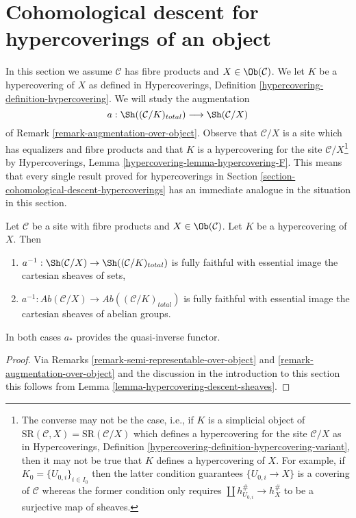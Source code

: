 \section{Cohomological descent for hypercoverings of an object}
\label{section-cohomological-descent-hypercoverings-X}

\noindent
In this section we assume $\mathcal{C}$ has fibre products
and $X \in \Ob(\mathcal{C})$. We let $K$ be a hypercovering of $X$
as defined in
Hypercoverings, Definition \ref{hypercovering-definition-hypercovering}.
We will study the augmentation
$$
a : \Sh((\mathcal{C}/K)_{total}) \longrightarrow \Sh(\mathcal{C}/X)
$$
of Remark \ref{remark-augmentation-over-object}.
Observe that $\mathcal{C}/X$ is a site which has equalizers
and fibre products and that $K$ is a
hypercovering for the site $\mathcal{C}/X$\footnote{The converse may not
be the case, i.e., if $K$ is a simplicial object of
$\text{SR}(\mathcal{C}, X) = \text{SR}(\mathcal{C}/X)$
which defines a hypercovering for the site $\mathcal{C}/X$ as in
Hypercoverings, Definition \ref{hypercovering-definition-hypercovering-variant},
then it may not be true that $K$ defines a hypercovering of $X$.
For example, if $K_0 = \{U_{0, i}\}_{i \in I_0}$
then the latter condition guarantees
$\{U_{0, i} \to X\}$ is a covering of $\mathcal{C}$
whereas the former condition only requires
$\coprod h_{U_{0, i}}^\# \to h_X^\#$ to be a surjective map
of sheaves.} by Hypercoverings, Lemma
\ref{hypercovering-lemma-hypercovering-F}.
This means that every single result proved for hypercoverings
in Section \ref{section-cohomological-descent-hypercoverings}
has an immediate analogue in the situation in this section.

\begin{lemma}
\label{lemma-hypercovering-X-descent-sheaves}
Let $\mathcal{C}$ be a site with fibre products and $X \in \Ob(\mathcal{C})$.
Let $K$ be a hypercovering of $X$. Then
\begin{enumerate}
\item $a^{-1} : \Sh(\mathcal{C}/X) \to \Sh((\mathcal{C}/K)_{total})$
is fully faithful with essential image the cartesian sheaves of sets,
\item $a^{-1} : \textit{Ab}(\mathcal{C}/X) \to
\textit{Ab}((\mathcal{C}/K)_{total})$
is fully faithful with essential image the cartesian sheaves
of abelian groups.
\end{enumerate}
In both cases $a_*$ provides the quasi-inverse functor.
\end{lemma}

\begin{proof}
Via Remarks \ref{remark-semi-representable-over-object} and
\ref{remark-augmentation-over-object} and the discussion in
the introduction to this section
this follows from Lemma \ref{lemma-hypercovering-descent-sheaves}.
\end{proof}

